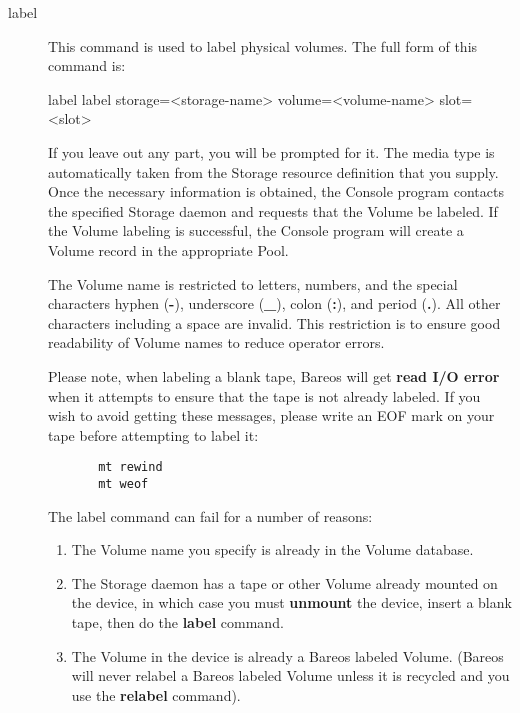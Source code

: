 \begin{description}
\item [label]
   This command is used to label physical volumes.
   The full form of this command is:

\begin{bconsole}{label}
label storage=<storage-name> volume=<volume-name> slot=<slot>
\end{bconsole}

   If you leave out any part, you will be prompted for it.  The media type
   is automatically taken from the Storage resource definition that you
   supply.  Once the necessary information is obtained, the Console program
   contacts the specified Storage daemon and requests that the Volume be
   labeled.  If the Volume labeling is successful, the Console program will
   create a Volume record in the appropriate Pool.

   The Volume name is restricted to letters, numbers, and the special
   characters hyphen ({\bf -}), underscore ({\bf \_}), colon ({\bf :}), and
   period ({\bf .}).  All other characters including a space are invalid.
   This restriction is to ensure good readability of Volume names to reduce
   operator errors.

   Please note, when labeling a blank tape, Bareos will get {\bf read I/O
   error} when it attempts to ensure that the tape is not already labeled.  If
   you wish to avoid getting these messages, please write an EOF mark on
   your tape before attempting to label it:

\footnotesize
\begin{verbatim}
       mt rewind
       mt weof
\end{verbatim}
\normalsize


The label command can fail for a number of reasons:

\begin{enumerate}
\item The Volume name you specify is already in the  Volume database.

\item The Storage daemon has a tape or other Volume already mounted on the
   device, in which case you must {\bf unmount} the device, insert a blank
   tape, then do the {\bf label} command.

\item The Volume in the device is already a Bareos labeled Volume.  (Bareos will
   never relabel a Bareos labeled Volume unless it is recycled and you use the
   {\bf relabel} command).


\end{enumerate}
\end{description}
